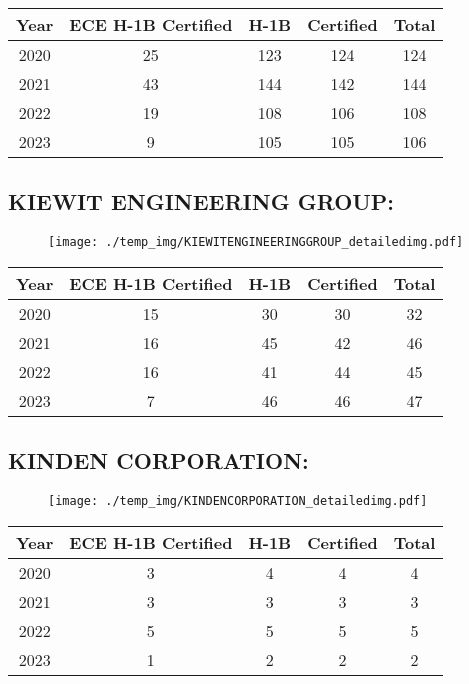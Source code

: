 \documentclass{article}%
\begin{document}
%
\begin{longtable}{c|c|c|c|c}%
\hline%
Year&ECE H{-}1B Certified&H{-}1B&Certified&Total\\%
\hline%
2020&25&123&124&124\\%
\hline%
2021&43&144&142&144\\%
\hline%
2022&19&108&106&108\\%
\hline%
2023&9&105&105&106\\%
\hline%
\end{longtable}

%
\newpage%
\subsection{KIEWIT ENGINEERING GROUP:}%
\label{subsec:KIEWITENGINEERINGGROUP}%
\label{KIEWITENGINEERINGGROUPdetailed}%


\begin{figure}[htbp]%
\centering%
\texttt{[image: ./temp\_img/KIEWITENGINEERINGGROUP\_detailedimg.pdf]}%
\end{figure}

%
\begin{longtable}{c|c|c|c|c}%
\hline%
Year&ECE H{-}1B Certified&H{-}1B&Certified&Total\\%
\hline%
2020&15&30&30&32\\%
\hline%
2021&16&45&42&46\\%
\hline%
2022&16&41&44&45\\%
\hline%
2023&7&46&46&47\\%
\hline%
\end{longtable}

%
\newpage%
\subsection{KINDEN CORPORATION:}%
\label{subsec:KINDENCORPORATION}%
\label{KINDENCORPORATIONdetailed}%


\begin{figure}[htbp]%
\centering%
\texttt{[image: ./temp\_img/KINDENCORPORATION\_detailedimg.pdf]}%
\end{figure}

%
\begin{longtable}{c|c|c|c|c}%
\hline%
Year&ECE H{-}1B Certified&H{-}1B&Certified&Total\\%
\hline%
2020&3&4&4&4\\%
\hline%
2021&3&3&3&3\\%
\hline%
2022&5&5&5&5\\%
\hline%
2023&1&2&2&2\\%
\hline%
\end{longtable}
\end{document}
